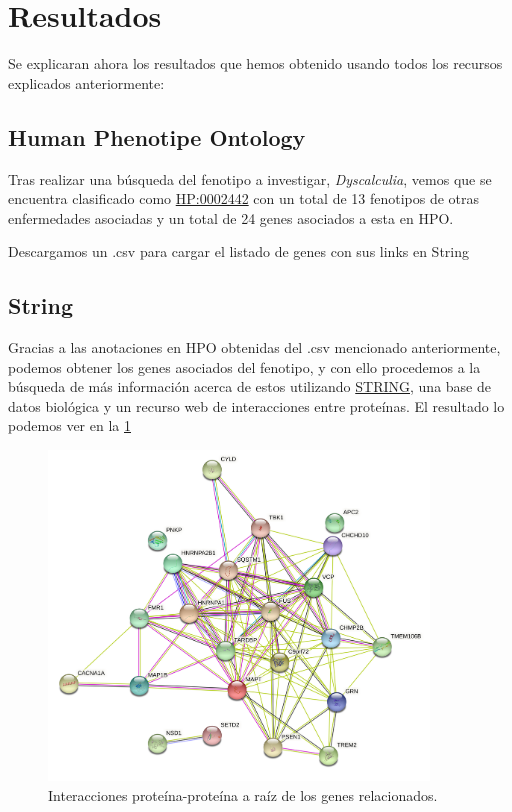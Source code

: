 \section{Resultados}

Se explicaran ahora los resultados que hemos obtenido usando todos los recursos explicados anteriormente:

\subsection{Human Phenotipe Ontology}

\hfill

Tras realizar una búsqueda del fenotipo a investigar, \textit{Dyscalculia}, vemos que se encuentra clasificado como \href{https://hpo.jax.org/app/browse/term/HP:0002442}{HP:0002442} con un total de 13 fenotipos de otras enfermedades asociadas y un total de 24 genes asociados a esta en HPO.

Descargamos un .csv para cargar el listado de genes con sus links en String

\subsection{String}

\hfill

Gracias a las anotaciones en HPO obtenidas del .csv mencionado anteriormente, podemos obtener los genes asociados del fenotipo, y con ello procedemos a la búsqueda de más información acerca de estos utilizando \href{https://string-db.org}{STRING}, una base de datos biológica y un recurso web de interacciones entre proteínas. El resultado lo podemos ver en la \ref{fig:string1}

\begin{figure}[h]
	\centering
	\includegraphics[width=0.90\textwidth]{figures/Gene_Relationship.png}
	\caption{Interacciones proteína-proteína a raíz de los genes relacionados. }
	\label{fig:string1}
\end{figure}

